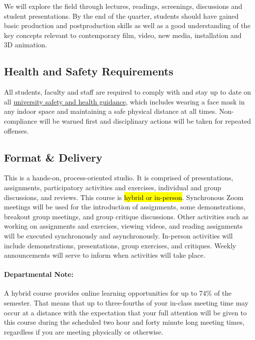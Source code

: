 We will explore the field through lectures, readings, screenings, discussions and student presentations. By the end of the quarter, students should have gained basic production and postproduction skills as well as a good understanding of the key concepts relevant to contemporary film, video, new media, installation and 3D animation.

\subsection{Health and Safety Requirements}

All students, faculty and staff are required to comply with and stay up to date on all \href{https://safeandhealthy.osu.edu}{university safety and health guidance}, which includes wearing a face mask in any indoor space and maintaining a safe physical distance at all times. Non-compliance will be warned first and disciplinary actions will be taken for repeated offenses.

\subsection{Format \& Delivery}

This is a hands-on, process-oriented studio. It is comprised of presentations, assignments, participatory activities and exercises, individual and group discussions, and reviews. This course is \hl{hybrid or in-person}. Synchronous Zoom meetings will be used for the introduction of assignments, some demonstrations, breakout group meetings, and group critique discussions. Other activities such as working on assignments and exercises, viewing videos, and reading assignments will be executed synchronously and asynchronously. In-person activities will include demonstrations, presentations, group exercises, and critiques. Weekly announcements will serve to inform when activities will take place.

\paragraph{Departmental Note:} A hybrid course provides online learning opportunities for up to 74\% of the semester. That means that up to three-fourths of your in-class meeting time may occur at a distance with the expectation that your full attention will be given to this course during the scheduled two hour and forty minute long meeting times, regardless if you are meeting physically or otherwise.

